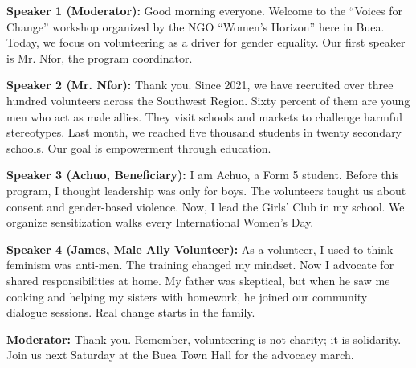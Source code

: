 \documentclass[11pt]{article}
\newcommand{\cle}[1]{{\popxbold\color{popdark}#1}}
\begin{document}
\begin{textebox}
\textbf{Speaker 1 (Moderator):} Good morning everyone. Welcome to the “Voices for Change” workshop organized by the \cle{NGO} “Women’s Horizon” here in Buea. Today, we focus on \cle{volunteering} as a driver for \cle{gender equality}. Our first speaker is Mr. Nfor, the program coordinator.

\textbf{Speaker 2 (Mr. Nfor):} Thank you. Since 2021, we have recruited over \cle{three hundred} volunteers across the Southwest Region. \cle{Sixty percent} of them are young men who act as \cle{male allies}. They visit schools and markets to challenge harmful \cle{stereotypes}. Last month, we reached \cle{five thousand} students in \cle{twenty} secondary schools. Our goal is \cle{empowerment} through education.

\textbf{Speaker 3 (Achuo, Beneficiary):} I am Achuo, a Form 5 student. Before this program, I thought leadership was only for boys. The volunteers taught us about \cle{consent} and \cle{gender-based violence}. Now, I lead the \cle{Girls’ Club} in my school. We organize \cle{sensitization} walks every \cle{International Women’s Day}.

\textbf{Speaker 4 (James, Male Ally Volunteer):} As a \cle{volunteer}, I used to think \cle{feminism} was anti-men. The training changed my \cle{mindset}. Now I advocate for \cle{shared responsibilities} at home. My father was skeptical, but when he saw me cooking and helping my sisters with homework, he joined our \cle{community dialogue} sessions. Real change starts in the family.

\textbf{Moderator:} Thank you. Remember, volunteering is not charity; it is \cle{solidarity}. Join us next Saturday at the Buea Town Hall for the \cle{advocacy} march.
\end{textebox}
\end{document}
